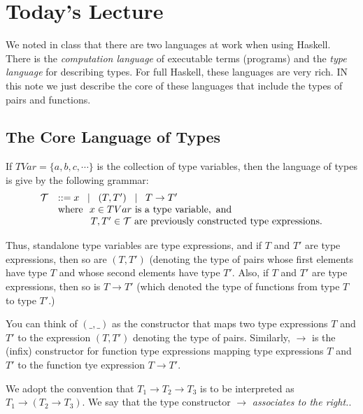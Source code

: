 \documentclass[11pt]{article}
\begin{document}


\section{Today's Lecture}

We noted in class that there are two languages at work when using Haskell.
There is the {\em{computation language}} of executable terms (programs) and the
{\em{type language}} for describing types.  For full Haskell, these languages
are very rich. IN this note we just describe the core of these languages that
include the types of pairs and functions.

\subsection{The Core Language of Types}

If $TVar=\{a,b,c,\cdots\}$ is the collection of type variables, then
the language of types is give by the following grammar:
\[\begin{array}{ll}
{\cal{T}} & ::=  x \;\; \mid \;\; (T,T') \;\; \mid \;\; T \rightarrow T' \\
&{\mathrm{where\ \ }} x\in{}TVar {\mathrm{\ is\ a\ type\ variable,\ and}}\\
&{\hspace{3.35em}} T,T'\in {\cal{T}} {\mathrm{\ are\ previously\ constructed\ type\ expressions.}}\\
\end{array}\]

Thus, standalone type variables are type expressions, and if $T$ and $T'$ are
type expressions, then so are $(T,T')$ (denoting the type of pairs whose first
elements have type $T$ and whose second elements have type $T'$. Also, if $T$
and $T'$ are type expressions, then so is $T\rightarrow{}T'$ (which denoted the
type of functions from type $T$ to type $T'$.)

You can think of $(\_,\_)$ as the constructor that maps two type expressions
$T$ and $T'$ to the expression $(T,T')$ denoting the type of pairs.  Similarly,
$\rightarrow$ is the (infix) constructor for function type expressions mapping
type expressions $T$ and $T'$ to the function tye expression
$T\rightarrow{}T'$.

We adopt the convention that $T_1\rightarrow{}T_2\rightarrow{}T_3$ is to be
interpreted as $T_1\rightarrow{}(T_2\rightarrow{}T_3)$.  We say that the type
constructor $\rightarrow$ {\em{associates to the right.}}.
\end{document}
